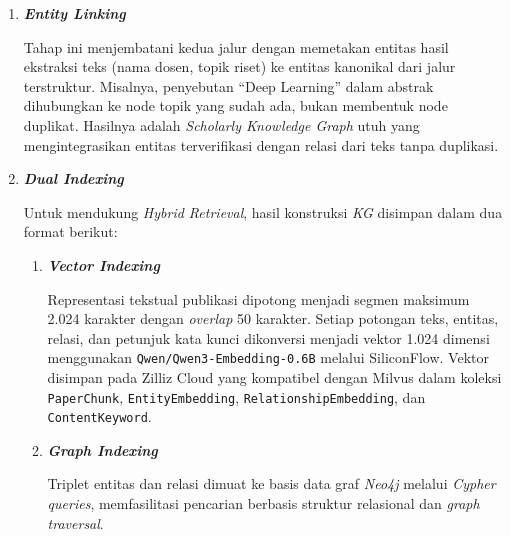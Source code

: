 \begin{enumerate}[label=\textbf{\arabic*.}, leftmargin=*, itemsep=10pt]
\begin{enumerate}[label=\textbf{\arabic*.}, leftmargin=0.75cm, itemsep=5pt]
\begin{enumerate}[label=\textbf{\alph*.}, leftmargin=0.75cm, itemsep=5pt]
                    \end{enumerate}

              \item \textbf{\textit{Entity Linking}}

                    \hspace*{0.75cm}Tahap ini menjembatani kedua jalur dengan memetakan entitas hasil ekstraksi teks (nama dosen, topik riset) ke entitas kanonikal dari jalur terstruktur. Misalnya, penyebutan ``Deep Learning'' dalam abstrak dihubungkan ke node topik yang sudah ada, bukan membentuk node duplikat. Hasilnya adalah \textit{Scholarly Knowledge Graph} utuh yang mengintegrasikan entitas terverifikasi dengan relasi dari teks tanpa duplikasi.

              \item \textbf{\textit{Dual Indexing}}

                    \hspace*{0.75cm}Untuk mendukung \textit{Hybrid Retrieval}, hasil konstruksi \textit{KG} disimpan dalam dua format berikut:

                    \begin{enumerate}[label=\textbf{\alph*.}, leftmargin=0.75cm, itemsep=5pt]
                        \item \textbf{\textit{Vector Indexing}}

                              \hspace*{0.75cm}Representasi tekstual publikasi dipotong menjadi segmen maksimum 2.024 karakter dengan \textit{overlap} 50 karakter. Setiap potongan teks, entitas, relasi, dan petunjuk kata kunci dikonversi menjadi vektor 1.024 dimensi menggunakan \texttt{Qwen/Qwen3-Embedding-0.6B} melalui SiliconFlow. Vektor disimpan pada Zilliz Cloud yang kompatibel dengan Milvus dalam koleksi \texttt{PaperChunk}, \texttt{EntityEmbedding}, \texttt{RelationshipEmbedding}, dan \texttt{ContentKeyword}.

                        \item \textbf{\textit{Graph Indexing}}

                              \hspace*{0.75cm}Triplet entitas dan relasi dimuat ke basis data graf \textit{Neo4j} melalui \textit{Cypher queries}, memfasilitasi pencarian berbasis struktur relasional dan \textit{graph traversal}.
                    \end{enumerate}

          \end{enumerate}


\end{enumerate}
